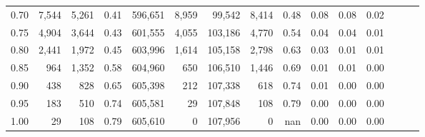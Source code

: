 \begin{tabular}{rrrrrrrrrrrrrrr}
0.70 &    7,544 &   5,261 &  0.41 &  596,651 &    8,959 &   99,542 &    8,414 &  0.48 &  0.08 &  0.08 &      0.02 \\
0.75 &    4,904 &   3,644 &  0.43 &  601,555 &    4,055 &  103,186 &    4,770 &  0.54 &  0.04 &  0.04 &      0.01 \\
0.80 &    2,441 &   1,972 &  0.45 &  603,996 &    1,614 &  105,158 &    2,798 &  0.63 &  0.03 &  0.01 &      0.01 \\
0.85 &      964 &   1,352 &  0.58 &  604,960 &      650 &  106,510 &    1,446 &  0.69 &  0.01 &  0.01 &      0.00 \\
0.90 &      438 &     828 &  0.65 &  605,398 &      212 &  107,338 &      618 &  0.74 &  0.01 &  0.00 &      0.00 \\
0.95 &      183 &     510 &  0.74 &  605,581 &       29 &  107,848 &      108 &  0.79 &  0.00 &  0.00 &      0.00 \\
1.00 &       29 &     108 &  0.79 &  605,610 &        0 &  107,956 &        0 &   nan &  0.00 &  0.00 &      0.00 \\
\bottomrule
\end{tabular}
